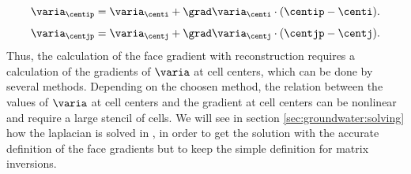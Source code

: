 \begin{equation}
 \label{eq:groundwater:103}
  \varia_{\centip} = \varia_{\centi} + \grad \varia_{\centi}  \cdot (\centip - \centi).
\end{equation}
\begin{equation}
 \label{eq:groundwater:104}
  \varia_{\centjp} = \varia_{\centj} + \grad \varia_{\centj} \cdot (\centjp - \centj).
\end{equation}
Thus, the calculation of the face gradient with reconstruction requires a calculation of the gradients of $\varia$ at cell centers, which can be done
by several methods. Depending on the choosen method, the relation between the values of $\varia$ at cell centers and the gradient at cell centers can
be nonlinear and require a large stencil of cells. We will see in section \ref{sec:groundwater:solving} how the laplacian is solved in \CS, in order to get the solution
with the accurate definition of the face gradients but to keep the simple definition for matrix inversions.

